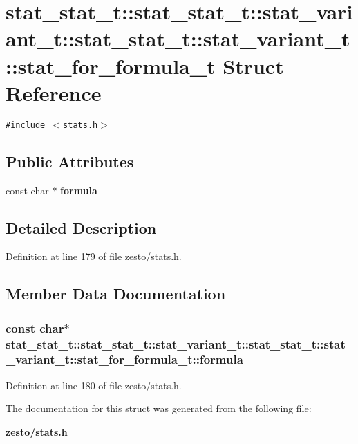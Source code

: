 \section{stat\_\-stat\_\-t::stat\_\-stat\_\-t::stat\_\-variant\_\-t::stat\_\-stat\_\-t::stat\_\-variant\_\-t::stat\_\-for\_\-formula\_\-t Struct Reference}
\label{structstat__stat__t_1_1stat__variant__t_1_1stat__for__formula__t}
{\tt \#include $<$stats.h$>$}

\subsection*{Public Attributes}
\begin{CompactItemize}
\item 
const char $\ast$ {\bf formula}
\end{CompactItemize}


\subsection{Detailed Description}


Definition at line 179 of file zesto/stats.h.

\subsection{Member Data Documentation}
\subsubsection[{formula}]{\setlength{\rightskip}{0pt plus 5cm}const char$\ast$ stat\_\-stat\_\-t::stat\_\-stat\_\-t::stat\_\-variant\_\-t::stat\_\-stat\_\-t::stat\_\-variant\_\-t::stat\_\-for\_\-formula\_\-t::formula}\label{structstat__stat__t_1_1stat__variant__t_1_1stat__for__formula__t_fd80f878ea2c6b0d537d6a86f1fab349}




Definition at line 180 of file zesto/stats.h.

The documentation for this struct was generated from the following file:\begin{CompactItemize}
\item 
{\bf zesto/stats.h}\end{CompactItemize}
